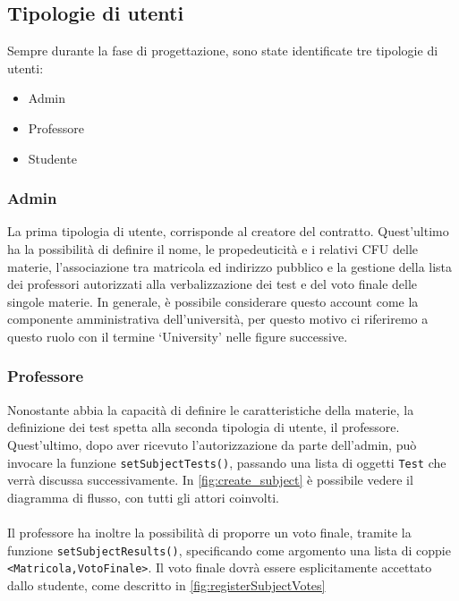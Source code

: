 \subsection{Tipologie di utenti}
\label{sec:roles}
Sempre durante la fase di progettazione, sono state identificate tre tipologie di utenti:
\begin{itemize}
    \item Admin
    \item Professore
    \item Studente
\end{itemize}

\subsubsection{Admin}
La prima tipologia di utente, corrisponde al creatore del contratto. Quest'ultimo ha la possibilità di definire il nome, le propedeuticità e i relativi CFU delle materie, l'associazione tra matricola ed indirizzo pubblico e la gestione della lista dei professori autorizzati alla verbalizzazione dei test e del voto finale delle singole materie. In generale, è possibile considerare questo account come la componente amministrativa dell'università, per questo motivo ci riferiremo a questo ruolo con il termine `University' nelle figure successive.

\subsubsection{Professore}
Nonostante abbia la capacità di definire le caratteristiche della materie, la definizione dei test spetta alla seconda tipologia di utente, il professore.
Quest'ultimo, dopo aver ricevuto l'autorizzazione da parte dell'admin, può invocare la funzione \texttt{setSubjectTests()}, passando una lista di oggetti \texttt{Test} che verrà discussa successivamente. In \autoref{fig:create_subject} è possibile vedere il diagramma di flusso, con tutti gli attori coinvolti.\\
\\
Il professore ha inoltre la possibilità di proporre un voto finale, tramite la funzione \texttt{setSubjectResults()}, specificando come argomento una lista di coppie \texttt{<Matricola,VotoFinale>}. Il voto finale dovrà essere esplicitamente accettato dallo studente, come descritto in \autoref{fig:registerSubjectVotes}

